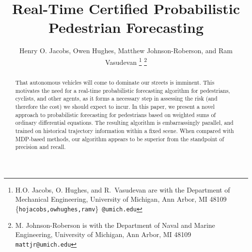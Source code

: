 \documentclass[letterpaper,10pt,conference]{ieeeconf}
\begin{document}
\title{Real-Time Certified Probabilistic Pedestrian Forecasting}

\author{Henry O. Jacobs, Owen Hughes, Matthew Johnson-Roberson, and Ram Vasudevan
 \thanks{ H.O. Jacobs, O. Hughes, and R.~Vasudevan are with the Department of Mechanical Engineering, University of Michigan, Ann Arbor, MI 48109
{\scriptsize \{\texttt{hojacobs,owhughes,ramv}\}~\texttt{@umich.edu}}}
\thanks{M. Johnson-Roberson is with the Department of Naval and Marine Engineering, University of Michigan, Ann Arbor, MI 48109\newline
{\scriptsize \texttt{mattjr@umich.edu}}}
}



\maketitle

\begin{abstract}
That autonomous vehicles will come to dominate our streets is imminent.
This motivates the need for a real-time probabilistic forecasting algorithm for pedestrians, cyclists, and other agents,
as it forms a necessary step in assessing the risk (and therefore the cost) we should expect to incur.
In this paper, we present a novel approach to probabilistic forecasting for pedestrians based on weighted sums of ordinary differential equations.
The resulting algorithm is embarrassingly parallel, and trained on historical trajectory information within a fixed scene.
When compared with MDP-based methods, our algorithm appears to be superior from the standpoint of precision and recall.
\end{abstract}
\end{document}
